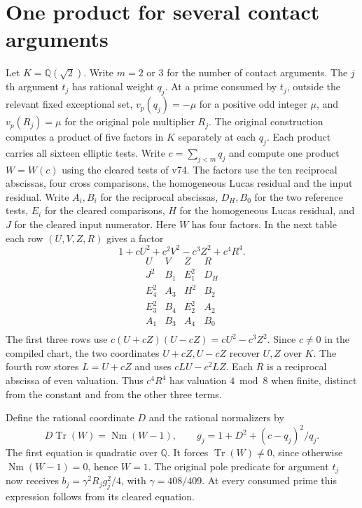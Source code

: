 \documentclass[11pt]{article}
\newcommand{\Q}{\mathbb Q}\newcommand{\Z}{\mathbb Z}\newcommand{\Tr}{\operatorname{Tr}}\newcommand{\Nm}{\operatorname{Nm}}
\begin{document}
\section{One product for several contact arguments}
Let $K=\Q(\sqrt{2})$. Write $m=2$ or $3$ for the number of contact arguments. The $j$th argument $t_j$ has rational weight $q_j$. At a prime consumed by $t_j$, outside the relevant fixed exceptional set, $v_p(q_j)=-\mu$ for a positive odd integer $\mu$, and $v_p(R_j)=\mu$ for the original pole multiplier $R_j$. The original construction computes a product of five factors in $K$ separately at each $q_j$. Each product carries all sixteen elliptic tests. Write $c=\sum_{j<m}q_j$ and compute one product $W=W(c)$ using the cleared tests of v74. The factors use the ten reciprocal abscissas, four cross comparisons, the homogeneous Lucas residual and the input residual. Write $A_i,B_i$ for the reciprocal abscissas, $D_H,B_0$ for the two reference tests, $E_i$ for the cleared comparisons, $H$ for the homogeneous Lucas residual, and $J$ for the cleared input numerator. Here $W$ has four factors. In the next table each row $(U,V,Z,R)$ gives a factor
\[
  1+cU^2+c^2 V^2-c^3 Z^2+c^4 R^4 .
\]
\[
\begin{array}{cccc}U&V&Z&R\\ \hline
J^2&B_1&E_1^2&D_H\\
E_4^2&A_3&H^2&B_2\\
E_3^2&B_4&E_2^2&A_2\\
A_1&B_3&A_4&B_0\\
\end{array}
\]
The first three rows use $c(U+cZ)(U-cZ)=cU^2-c^3Z^2$. Since $c\ne0$ in the compiled chart, the two coordinates $U+cZ,U-cZ$ recover $U,Z$ over $K$. The fourth row stores $L=U+cZ$ and uses $cLU-c^2LZ$. Each $R$ is a reciprocal abscissa of even valuation. Thus $c^4R^4$ has valuation $4\bmod8$ when finite, distinct from the constant and from the other three terms.

Define the rational coordinate $D$ and the rational normalizers by
\[
 D\Tr(W)=\Nm(W-1),\qquad
 g_j=1+D^2+(c-q_j)^2/q_j .
\]
The first equation is quadratic over $\Q$. It forces $\Tr(W)\ne0$, since otherwise $\Nm(W-1)=0$, hence $W=1$. The original pole predicate for argument $t_j$ now receives $b_j=\gamma^2 R_j g_j^2/4$, with $\gamma=408/409$. At every consumed prime this expression follows from its cleared equation.
\end{document}
